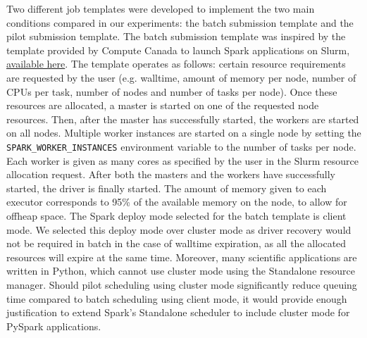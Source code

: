 \documentclass{IEEEtran}
\begin{document}
    Two different job templates were developed to implement the two main
    conditions compared in our experiments: the batch submission
    template and the pilot submission template. The batch submission template was
    inspired by the template provided by Compute Canada to launch Spark applications 
    on Slurm, \href{https://docs.computecanada.ca/wiki/Apache\_Spark/en}{available here}.
    The template operates as follows: certain resource requirements are requested by
    the user (e.g. walltime, amount of memory per node, number of CPUs per task, number 
    of nodes and number of tasks per node). Once these resources are allocated, a 
    master is started on one of the requested node resources. Then, after the master
    has successfully started, the workers are started on all nodes. Multiple worker
    instances are started on a single node by setting the \texttt{SPARK\_WORKER\_INSTANCES}
    environment variable to the number of tasks per node. Each worker is given as many
     cores as specified by the user in the Slurm resource allocation request.
    After both the masters and the workers have successfully started, the driver is finally
    started. The amount of memory given to each executor corresponds to 95\% of the 
    available memory on the node, to allow for offheap space. 
    The Spark deploy mode selected for the batch template is client mode. We selected this
    deploy mode over cluster mode as driver recovery would not be required in batch in the
    case of walltime expiration, as all the allocated resources will expire at the same time.
    Moreover, many scientific applications are written in Python, which cannot use cluster mode using
    the Standalone resource manager. Should pilot scheduling using cluster mode significantly reduce
    queuing time compared to batch scheduling using client mode, it would provide enough justification to extend
    Spark's Standalone scheduler to include cluster mode for PySpark applications.
\end{document}
